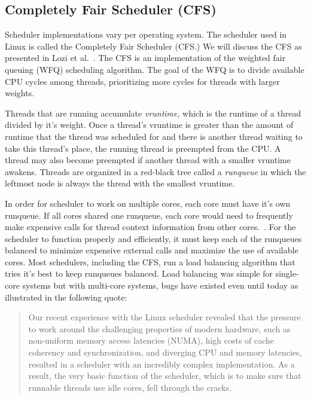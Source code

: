 \documentclass{sig-alternate}
\begin{document}
\subsection{Completely Fair Scheduler (CFS)}
\label{sec:cfs}

Scheduler implementations vary per operating system. The scheduler used in Linux is called the Completely Fair Scheduler (CFS.) We will discuss the CFS as presented in Lozi et al.~\cite{Lozi:2016}. The CFS is an implementation of the weighted fair queuing (WFQ) scheduling algorithm. The goal of the WFQ is to divide available CPU cycles among threads, prioritizing more cycles for threads with larger weights.

Threads that are running accumulate \emph{vruntime}, which is the runtime of a thread divided by it's weight. Once a thread's vruntime is greater than the amount of runtime that the thread was scheduled for and there is another thread waiting to take this thread's place, the running thread is preempted from the CPU. A thread may also become preempted if another thread with a smaller vruntime awakens. Threads are organized in a red-black tree called a \emph{runqueue} in which the leftmost node is always the thread with the smallest vruntime.~\cite{Lozi:2016}

In order for scheduler to work on multiple cores, each core must have it's own runqueue. If all cores shared one runqueue, each core would need to frequently make expensive calls for thread context information from other cores.~\cite{Lozi:2016}. For the scheduler to function properly and efficiently, it must keep each of the runqueues balanced to minimize expensive external calls and maximize the use of available cores. Most schedulers, including the CFS, run a load balancing algorithm that tries it's best to keep runqueues balanced. Load balancing was simple for single-core systems but with multi-core systems, bugs have existed even until today as illustrated in the following quote:

\begin{quote}
Our recent experience with the Linux scheduler revealed that the pressure to work around the challenging properties of modern hardware, such as non-uniform memory access latencies (NUMA), high costs of cache coherency and synchronization, and diverging CPU and memory latencies, resulted in a scheduler with an incredibly complex implementation. As a result, the very basic function of the scheduler, which is to make sure that runnable threads use idle cores, fell through the cracks.~\cite{Lozi:2016}
\end{quote}
\end{document}
